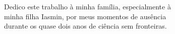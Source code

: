 
\chapter*{}
\vspace{15cm}
\begin{flushright}
Dedico este trabalho à minha família, especialmente à\\
minha filha Iasmin, por meus momentos de ausência \\
durante os quase dois anos de ciência sem fronteiras.
\end{flushright}